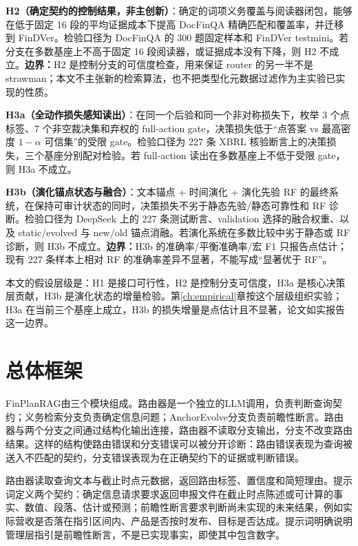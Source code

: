 \begin{revbox}
\noindent\textbf{H2（确定契约的控制结果，非主创新）}：确定的词项义务覆盖与阅读器闭包，能够在低于固定 16 段的平均证据成本下提高 DocFinQA 精确匹配和覆盖率，并迁移到 FinDVer。检验口径为 DocFinQA 的 300 题固定样本和 FinDVer testmini。若分支在多数基座上不高于固定 16 段阅读器，或证据成本没有下降，则 H2 不成立。\textbf{边界：}H2 是控制分支的可信度检查，用来保证 router 的另一半不是 strawman；本文不主张新的检索算法，也不把类型化元数据过滤作为主实验已实现的性质。
\end{revbox}

\begin{revbox}
\noindent\textbf{H3a（全动作损失感知读出）}：在同一个后验和同一个非对称损失下，枚举 3 个点标签、7 个非空裁决集和弃权的 full-action gate，决策损失低于“点答案 vs 最高密度 $1-\alpha$ 可信集”的受限 gate。检验口径为 227 条 XBRL 核验断言上的决策损失，三个基座分别配对检验。若 full-action 读出在多数基座上不低于受限 gate，则 H3a 不成立。
\end{revbox}

\begin{revbox}
\noindent\textbf{H3b（演化锚点状态与融合）}：文本锚点 + 时间演化 + 演化先验 RF 的最终系统，在保持可审计状态的同时，决策损失不劣于静态先验/静态可靠性和 RF 诊断。检验口径为 DeepSeek 上的 227 条测试断言、validation 选择的融合权重、以及 static/evolved 与 new/old 锚点消融。若演化系统在多数比较中劣于静态或 RF 诊断，则 H3b 不成立。\textbf{边界：}H3b 的准确率/平衡准确率/宏 F1 只报告点估计；现有 227 条样本上相对 RF 的准确率差异不显著，不能写成“显著优于 RF”。
\end{revbox}

本文的假设层级是：H1 是接口可行性，H2 是控制分支可信度，H3a 是核心决策层贡献，H3b 是演化状态的增量检验。第\ref{ch:empirical}章按这个层级组织实验；H3a 在当前三个基座上成立，H3b 的损失增量是点估计且不显著，论文如实报告这一边界。


\section{总体框架}

FinPlanRAG由三个模块组成。路由器是一个独立的LLM调用，负责判断查询契约；义务检索分支负责确定信息问题；AnchorEvolve分支负责前瞻性断言。路由器与两个分支之间通过结构化输出连接，路由器不读取分支输出，分支不改变路由结果。这样的结构使路由错误和分支错误可以被分开诊断：路由错误表现为查询被送入不匹配的契约，分支错误表现为在正确契约下的证据或判断错误。

路由器读取查询文本与截止时点元数据，返回路由标签、置信度和简短理由。提示词定义两个契约：确定信息请求要求返回申报文件在截止时点陈述或可计算的事实、数值、段落、估计或预测；前瞻性断言要求判断尚未实现的未来结果，例如实际营收是否落在指引区间内、产品是否按时发布、目标是否达成。提示词明确说明管理层指引是前瞻性断言，不是已实现事实，即使其中包含数字。

